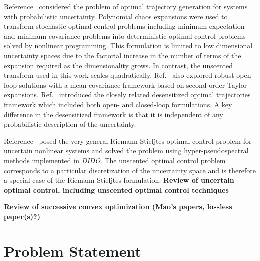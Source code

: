 \documentclass[10pt,a4paper]{article}
\begin{document}
	Reference~\cite{PCE_OCP_Bhattacharya} considered the problem of optimal trajectory generation for systems with probabilistic uncertainty. Polynomial chaos expansions were used to transform stochastic optimal control problems including minimum expectation and minimum covariance problems into deterministic optimal control problems solved by nonlinear programming. This formulation is limited to low dimensional uncertainty spaces due to the factorial increase in the number of terms of the expansion required as the dimensionality grows. In contrast, the unscented transform used in this work scales quadratically. Ref.~\cite{OpenLoopUncertain} also explored robust open-loop solutions with a mean-covariance framework based on second order Taylor expansions. Ref.~\cite{Desensitized} introduced the closely related desensitized optimal trajectories framework which included both open- and closed-loop formulations. A key difference in the desensitized framework is that it is independent of any probabilistic description of the uncertainty.
	
	Reference~\cite{RSOptimalControl} posed the very general Riemann-Stieljtes optimal control problem for uncertain nonlinear systems and solved the problem using hyper-pseudospectral methods implemented in \textit{DIDO}. The unscented optimal control problem corresponds to a particular discretization of the uncertainty space and is therefore a special case of the Riemann-Stieljtes formulation. \textbf{Review of uncertain optimal control, including unscented optimal control techniques }
			
	\textbf{Review of successive convex optimization (Mao's papers, lossless paper(s)?)}
	
	
	\section{Problem Statement}
	
\end{document}
